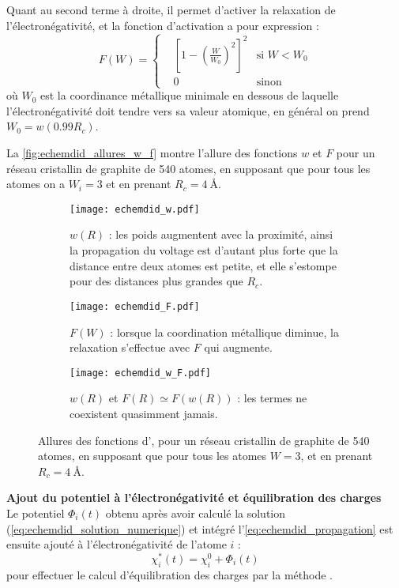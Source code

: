 Quant au second terme à droite, il permet d'activer la relaxation de l'électronégativité, et la fonction d'activation a pour expression :
\begin{equation*}
    F(W) = \left\{
        \begin{aligned}
            &\left[ 1 - \left( \frac{W}{W_0}\right)^2\right]^2 &\text{si } W < W_0\\
            &0 &\text{sinon}
        \end{aligned}
    \right.
\end{equation*}
où $W_0$ est la coordinance métallique minimale en dessous de laquelle l'électronégativité doit tendre vers sa valeur atomique, en général on prend $W_0 = w(\num{0.99}R_c)$.

La \autoref{fig:echemdid_allures_w_f} montre l'allure des fonctions $w$ et $F$ pour un réseau cristallin de graphite de \num{540} atomes, en supposant que pour tous les atomes on a $W_i = \num{3}$ et en prenant $R_c = \qty{4}{\angstrom}$.

\begin{figure}[h!]
    \centering
    \begin{subfigure}{\textwidth}
        \centering
        \texttt{[image: echemdid\_w.pdf]}
        \caption{$w(R)$ : {\footnotesize les poids augmentent avec la proximité, ainsi la propagation du voltage est d'autant plus forte que la distance entre deux atomes est petite, et elle s'estompe pour des distances plus grandes que $R_c$.}}
    \end{subfigure}
    \begin{subfigure}{\textwidth}
        \centering
        \texttt{[image: echemdid\_F.pdf]}
        \caption{$F(W)$ : {\footnotesize lorsque la coordination métallique diminue, la relaxation s'effectue avec $F$ qui augmente.}}
    \end{subfigure}
    \begin{subfigure}{\textwidth}
        \centering
        \texttt{[image: echemdid\_w\_F.pdf]}
        \caption{$w(R)$ et $F(R) \simeq F(w(R))$ : {\footnotesize les termes ne coexistent quasimment jamais.}}
    \end{subfigure}
    \caption{Allures des fonctions d'\echemdid{}, {\footnotesize pour un réseau cristallin de graphite de \num{540} atomes, en supposant que pour tous les atomes $W = \num{3}$, et en prenant $R_c = \qty{4}{\angstrom}$.}}
    \label{fig:echemdid_allures_w_f}
\end{figure}

\textbf{Ajout du potentiel à l'électronégativité et équilibration des charges}\\
Le potentiel $\Phi_i (t)$ obtenu après avoir calculé la solution (\ref{eq:echemdid_solution_numerique}) et intégré l'\autoref{eq:echemdid_propagation} est ensuite ajouté à l'électronégativité de l'atome $i$ :
\begin{equation*}
    \boxed%
    {
        \chi_i^* (t) = \chi_i^0 + \Phi_i (t)
    }
\end{equation*}
pour effectuer le calcul d'équilibration des charges par la méthode \qeq{}.
